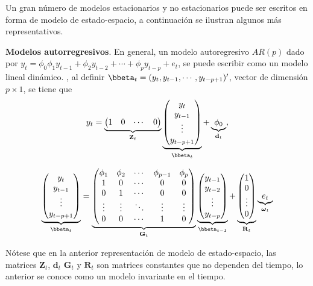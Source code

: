 Un gran número de modelos estacionarios y no estacionarios puede ser escritos en forma de modelo de estado-espacio, a continuación se ilustran algunos más representativos. 

\begin{Eje}\label{AR_p}
\textbf{Modelos autorregresivos}. En general, un modelo autoregresivo $AR(p)$  dado por $y_t=\phi_0\phi_1y_{t-1}+\phi_2y_{t-2}+\cdots+\phi_py_{t-p}+e_t$, se puede escribir como un modelo lineal dinámico. , al definir $\bbeta_t=(
y_t,y_{t-1},\cdots,y_{t-p+1})'$, vector de dimensión $p\times 1$, se tiene que
\begin{equation*}
y_t=\underbrace{\begin{pmatrix}
1&0&\cdots&0
\end{pmatrix}}_{\mathbf{Z}_t}\underbrace{\begin{pmatrix}
y_t\\y_{t-1}\\\vdots\\y_{t-p+1}
\end{pmatrix}}_{\bbeta_t}+\underbrace{\phi_0}_{\mathbf{d}_t},
\end{equation*}

\begin{equation*}
\underbrace{\begin{pmatrix}
y_t\\y_{t-1}\\\vdots\\y_{t-p+1}
\end{pmatrix}}_{\bbeta_t}=\underbrace{\begin{pmatrix}
\phi_1&\phi_2&\cdots&\phi_{p-1}&\phi_p\\
1&0&\cdots&0&0\\
0&1&\cdots&0&0\\
\vdots&\vdots&\ddots&\vdots&\vdots\\
0&0&\cdots&1&0
\end{pmatrix}}_{\mathbf{G}_t}\underbrace{\begin{pmatrix}
y_{t-1}\\y_{t-2}\\\vdots\\y_{t-p}
\end{pmatrix}}_{\bbeta_{t-1}}+\underbrace{\begin{pmatrix}
1\\0\\\vdots\\0
\end{pmatrix}}_{\mathbf{R}_t}\underbrace{e_t}_{\boldsymbol{\omega}_t}
\end{equation*}

Nótese que en la anterior representación de modelo de estado-espacio, las matrices $\mathbf{Z}_t$, $\mathbf{d}_t$ $\mathbf{G}_t$ y $\mathbf{R}_t$ son matrices constantes que no dependen del tiempo, lo anterior se conoce como un modelo invariante en el tiempo.
\end{Eje}

